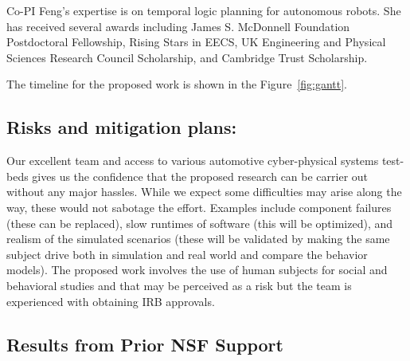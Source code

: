 Co-PI Feng's expertise is on temporal logic planning for autonomous robots. She has received several awards including James S. McDonnell Foundation Postdoctoral Fellowship, Rising Stars in EECS, UK Engineering and Physical Sciences Research Council Scholarship, and Cambridge Trust Scholarship.

The timeline for the proposed work  is shown in the Figure~\ref{fig:gantt}.



\subsection{Risks and mitigation plans:}

Our excellent team and access to various automotive cyber-physical systems test-beds gives us the confidence that the proposed research can be carrier out without any major hassles. While we expect some difficulties may arise along the way, these would not sabotage the effort. Examples include component failures (these can be replaced), slow runtimes of software (this will be optimized), and realism of the simulated scenarios (these will be validated by making the same subject drive both in simulation and real world and compare the behavior models). The proposed work involves the use of human subjects for social and behavioral studies and that may be perceived as a risk but the team is experienced with obtaining IRB approvals.

\subsection{Results from Prior NSF Support}
\label{subsec:prior}

